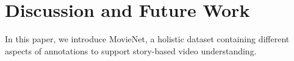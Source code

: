 \section{Discussion and Future Work}
\label{sec:p1-discussion}

In this paper, we introduce MovieNet, a holistic dataset containing different aspects of annotations to support story-based video understanding.